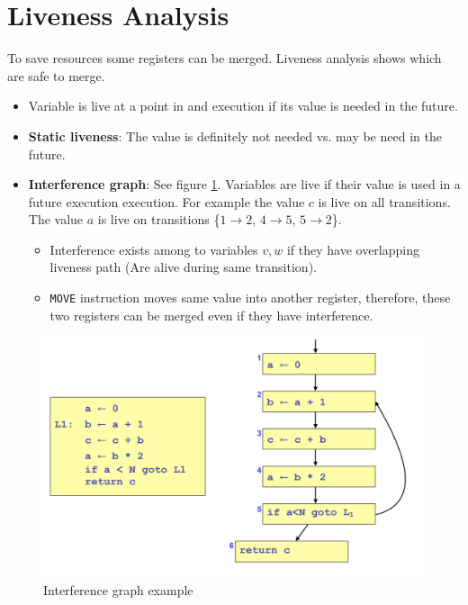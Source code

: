 \newpage

\section{Liveness Analysis}
To save resources some registers can be merged. Liveness analysis shows which are safe to merge.\\

\begin{itemize}
    \item Variable is live at a point in and execution if its value is needed in the future.
    \item \textbf{Static liveness}: The value is definitely not needed vs. may be need in the future.
    \item \textbf{Interference graph}: See figure \ref{fig:interference}. Variables are live if their value is used in a future execution execution. For example the value $c$ is live on all transitions. The value $a$ is live on transitions \{$1\rightarrow 2$, $4\rightarrow 5$, $5\rightarrow 2$\}.
    \begin{itemize}
        \item Interference exists among to variables $v,w$ if they have overlapping liveness path (Are alive during same transition).
        \item \texttt{MOVE} instruction moves same value into another register, therefore, these two registers can be merged even if they have interference.
    \end{itemize}
\end{itemize}

\begin{figure}[H]
    \centering
    \includegraphics[scale = 0.35]{assets/interference graph.PNG}
    \caption{Interference graph example}
    \label{fig:interference}
\end{figure}

